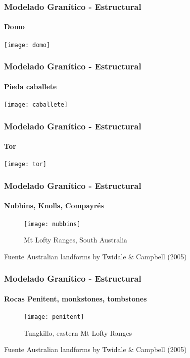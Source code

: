 \documentclass{beamer}
\begin{document}
\begin{frame}
\frametitle{Modelado Granítico - Estructural}
\framesubtitle{Domo}
\begin{center}
\texttt{[image: domo]}
\end{center}
\end{frame}
\begin{frame}
\frametitle{Modelado Granítico - Estructural}
\framesubtitle{Pieda caballete}
\begin{center}
\texttt{[image: caballete]}
\end{center}
\end{frame}
\begin{frame}
\frametitle{Modelado Granítico - Estructural}
\framesubtitle{Tor}
\begin{center}
\texttt{[image: tor]}
\end{center}
\end{frame}
\begin{frame}
\frametitle{Modelado Granítico - Estructural}
\framesubtitle{Nubbins, Knolls, Compayrés}
\begin{center}
\begin{figure}
\texttt{[image: nubbins]}
\caption{Mt Lofty Ranges, South Australia}
\end{figure}
\end{center}
\tiny{Fuente Australian landforms by Twidale \& Campbell (2005)}
\end{frame}
\begin{frame}
\frametitle{Modelado Granítico - Estructural}
\framesubtitle{Rocas Penitent, monkstones, tombstones}
\begin{center}
\begin{figure}
\texttt{[image: penitent]}
\caption{Tungkillo, eastern Mt Lofty Ranges}
\end{figure}
\end{center}
\tiny{Fuente Australian landforms by Twidale \& Campbell (2005)}
\end{frame}
\end{document}
